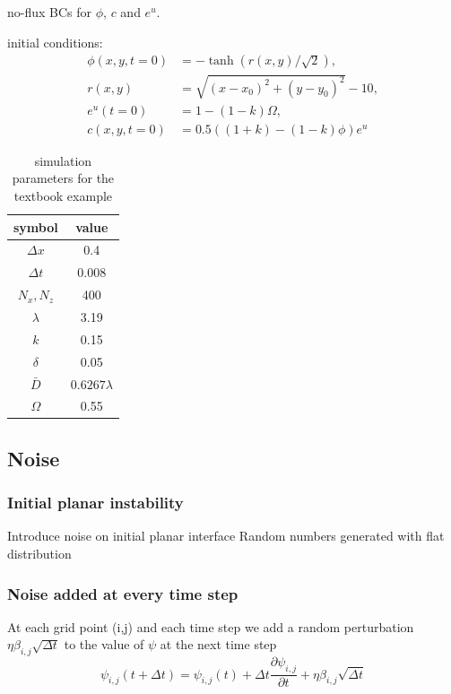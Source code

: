 \documentclass[a4paper,12pt]{article}
\begin{document}
no-flux BCs for $\phi$, $c$ and $e^u$.

initial conditions:
\begin{align}
\phi(x,y,t=0) &= -\tanh(r(x,y)/\sqrt{2}), \\
r(x,y) &= \sqrt{ (x-x_0)^2 + (y-y_0)^2} - 10, \\
e^u(t=0) & =1  - (1-k) \Omega,\\
c(x,y,t=0) &= 0.5 ( (1+k) - (1-k)\phi )e^u
\end{align}

\begin{table}
\centering
\caption{simulation parameters for the textbook example}
\begin{tabular}{c c  }
\toprule
symbol & value \\
\midrule
$\Delta x$ & 0.4 \\
$\Delta t $ & 0.008 \\
$N_x,N_z$ & 400 \\
$\lambda$ & 3.19 \\
$k$ & 0.15 \\
$\delta$ & 0.05 \\
$\bar{D}$ & $0.6267\lambda$  \\
$\Omega$ & 0.55 \\
\bottomrule
\end{tabular}
\end{table}





\subsection{Noise}
\subsubsection{Initial planar instability}
Introduce noise on initial planar interface\cite{Yu2018,Xing2015}
Random numbers generated with flat distribution
\subsubsection{Noise added at every time step}
At each grid point (i,j) and each time step we add a random perturbation $\eta\beta_{i,j}\sqrt{\Delta t}$ to the value of $\psi$ at the next time step \cite{Tourret2015}
\begin{equation}
\psi_{i, j}(t+\Delta t)=\psi_{i, j}(t)+\Delta t \frac{\partial \psi_{i, j}}{\partial t}+\eta \beta_{i, j} \sqrt{\Delta t}
\end{equation}
\end{document}
